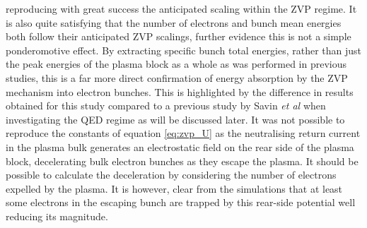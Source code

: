 reproducing with great success the anticipated scaling within the ZVP regime. It is also quite satisfying that the number of electrons and bunch mean energies both follow their anticipated ZVP scalings, further evidence this is not a simple ponderomotive effect. By extracting specific bunch total energies, rather than just the peak energies of the plasma block as a whole as was performed in previous studies, this is a far more direct confirmation of energy absorption by the ZVP mechanism into electron bunches. This is highlighted by the difference in results obtained for this study compared to a previous study by Savin \textit{et al} \cite{savinEnergyAbsorptionLaserQED2019} when investigating the QED regime as will be discussed later. It was not possible to reproduce the constants of equation \ref{eq:zvp_U} as the neutralising return current in the plasma bulk generates an electrostatic field on the rear side of the plasma block, decelerating bulk electron bunches as they escape the plasma. It should be possible to calculate the deceleration by considering the number of electrons expelled by the plasma. It is however, clear from the simulations that at least some electrons in the escaping bunch are trapped by this rear-side potential well reducing its magnitude.

